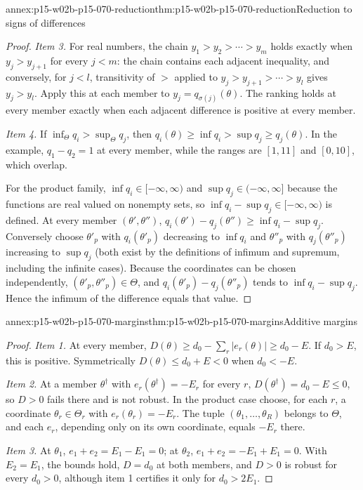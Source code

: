 \begin{annexitem}{annex:p15-w02b-p15-070-reduction}{thm:p15-w02b-p15-070-reduction}{Reduction to signs of differences}
\begin{proof}
\emph{Item 3.} For real numbers, the chain
\(y_1>y_2>\cdots>y_m\) holds exactly when \(y_j>y_{j+1}\) for every
\(j<m\): the chain contains each adjacent inequality, and conversely,
for \(j<l\), transitivity of \(>\) applied to \(y_j>y_{j+1}>\cdots>y_l\)
gives \(y_j>y_l\). Apply this at each member to
\(y_j=q_{\sigma(j)}(\theta)\). The ranking holds at every member exactly
when each adjacent difference is positive at every member.

\emph{Item 4.} If \(\inf_\Theta q_i>\sup_\Theta q_j\), then
\(q_i(\theta)\geq\inf q_i>\sup q_j\geq q_j(\theta)\). In the example,
\(q_1-q_2=1\) at every member, while the ranges are \([1,11]\) and
\([0,10]\), which overlap.

For the product family, \(\inf q_i\in[-\infty,\infty)\) and
\(\sup q_j\in(-\infty,\infty]\) because the functions are real valued on
nonempty sets, so \(\inf q_i-\sup q_j\in[-\infty,\infty)\) is defined.
At every member \((\theta',\theta'')\),
\(q_i(\theta')-q_j(\theta'')\geq\inf q_i-\sup q_j\). Conversely choose
\(\theta'_p\) with \(q_i(\theta'_p)\) decreasing to \(\inf q_i\) and
\(\theta''_p\) with \(q_j(\theta''_p)\) increasing to \(\sup q_j\) (both
exist by the definitions of infimum and supremum, including the infinite
cases). Because the coordinates can be chosen independently,
\((\theta'_p,\theta''_p)\in\Theta\), and
\(q_i(\theta'_p)-q_j(\theta''_p)\) tends to \(\inf q_i-\sup q_j\).
Hence the infimum of the difference equals that value.
\end{proof}
\end{annexitem}

\begin{annexitem}{annex:p15-w02b-p15-070-margins}{thm:p15-w02b-p15-070-margins}{Additive margins}
\begin{proof}
\emph{Item 1.} At every member,
\(D(\theta)\geq d_0-\sum_r|e_r(\theta)|\geq d_0-E\). If \(d_0>E\), this
is positive. Symmetrically
\(D(\theta)\leq d_0+E<0\) when \(d_0<-E\).

\emph{Item 2.} At a member \(\theta^\dagger\) with
\(e_r(\theta^\dagger)=-E_r\) for every \(r\),
\(D(\theta^\dagger)=d_0-E\leq0\), so \(D>0\) fails there and is not
robust. In the product case choose, for each \(r\), a coordinate
\(\theta_r\in\Theta_r\) with \(e_r(\theta_r)=-E_r\). The tuple
\((\theta_1,\ldots,\theta_R)\) belongs to \(\Theta\), and each
\(e_r\), depending only on its own coordinate, equals \(-E_r\) there.

\emph{Item 3.} At \(\theta_1\), \(e_1+e_2=E_1-E_1=0\); at
\(\theta_2\), \(e_1+e_2=-E_1+E_1=0\). With \(E_2=E_1\), the bounds hold,
\(D=d_0\) at both members, and \(D>0\) is robust for every \(d_0>0\),
although item 1 certifies it only for \(d_0>2E_1\).
\end{proof}
\end{annexitem}

